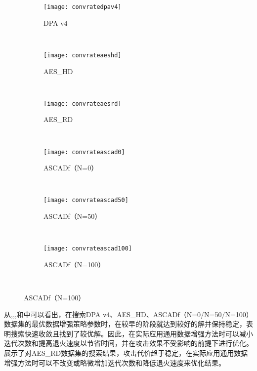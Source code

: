 {	\begin{figure}[!h]
		\centering
		\begin{subfigure}[b]{\trif\textwidth}
			\texttt{[image: convratedpav4]}
			\caption{DPA v4}
			\label{fig:convratedpav4}
		\end{subfigure}%
		~%
		\begin{subfigure}[b]{\trif\textwidth}
			\texttt{[image: convrateaeshd]}
			\caption{AES\_HD}
			\label{fig:convrateaeshd}
		\end{subfigure}
		~%
		\begin{subfigure}[b]{\trif\textwidth}
			\texttt{[image: convrateaesrd]}
			\caption{AES\_RD}
			\label{fig:convrateaesrd}
		\end{subfigure}
		\\%
		\begin{subfigure}[b]{\trif\textwidth}
			\texttt{[image: convrateascad0]}
			\caption{ASCADf（N=0）}
			\label{fig:convrateascad0}
		\end{subfigure}%
		~%
		\begin{subfigure}[b]{\trif\textwidth}
			\texttt{[image: convrateascad50]}
			\caption{ASCADf（N=50）}
			\label{fig:convrateascad50}
		\end{subfigure}
		~%
		\begin{subfigure}[b]{\trif\textwidth}
			\texttt{[image: convrateascad100]}
			\caption{ASCADf（N=100）}
			\label{fig:convrateascad100}
		\end{subfigure}
		\\%
		\label{fig:convrateit}
	\end{figure}
	
	从,,,和中可以看出，在搜索DPA v4、AES\_HD、ASCADf（N=0/N=50/N=100）数据集的最优数据增强策略参数时，在较早的阶段就达到较好的解并保持稳定，表明搜索快速收敛且找到了较优解。因此，在实际应用通用数据增强方法时可以减小迭代次数和提高退火速度以节省时间，并在攻击效果不受影响的前提下进行优化。展示了对AES\_RD数据集的搜索结果，攻击代价趋于稳定，在实际应用通用数据增强方法时可以不改变或略微增加迭代次数和降低退火速度来优化结果。
	
}
